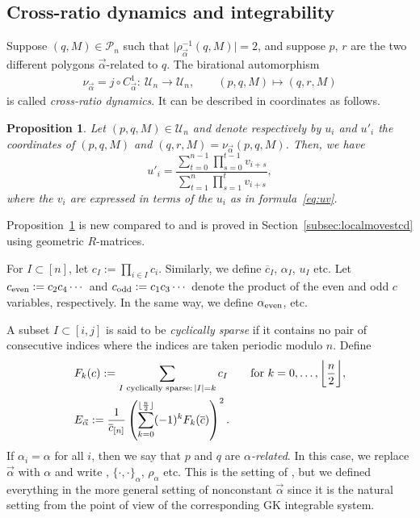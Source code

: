 \documentclass[10pt,a4paper]{amsart}
\numberwithin{equation}{section}
\newtheorem{Proposition}[Theorem]{Proposition}
 { \theoremstyle{definition}
\newtheorem{Definition}[Theorem]{Definition}
\newtheorem{Note}[Theorem]{Note}
\newtheorem{Example}[Theorem]{Example}
\newtheorem{Remark}[Theorem]{Remark} }
\DeclarePairedDelimiter\floor{\lfloor}{\rfloor}
\newcommand{\ra}{\rightarrow}
\begin{document}
	\subsection{Cross-ratio dynamics and integrability}
	
	Suppose $(q,M) \in \mathcal P_n$ such that $\bigl|\rho_{\vec \alpha}^{-1}(q,M)\bigr|=2$, and suppose $p$, $r$ are the two different polygons $\vec \alpha$-related to $q$. The birational automorphism
	\begin{align*}
		\nu_{\vec \alpha}=j\circ C^1_{\vec \alpha}\colon \ \mathcal U_n \ra \mathcal U_n,\qquad
		(p,q,M) \mapsto (q,r,M)
	\end{align*}
	is called \emph{cross-ratio dynamics}. It can be described in coordinates as follows.
	
	\begin{Proposition}
		\label{prop:uevolution}
		Let $(p,q,M)\in \mathcal U_n$ and denote respectively by $u_i$ and $u'_i$ the coordinates of $(p,q,M)$ and $(q,r,M)=\nu_{\vec \alpha}(p,q,M)$. Then, we have
		\begin{equation}
			\label{eq:ILP}
			u'_i=\frac{\sum\limits_{t=0}^{n-1}\prod\limits_{s=0}^{t-1}v_{i+s}}{\sum\limits_{t=1}^{n}\prod\limits_{s=1}^{t}v_{i+s}},
		\end{equation}
		where the $v_i$ are expressed in terms of the $u_i$ as in formula~\eqref{eq:uv}.
	\end{Proposition}
	
	Proposition~\ref{prop:uevolution} is new compared to \cite{AFIT} and is proved in Section~\ref{subsec:localmovestcd} using geometric $R$-matrices.
	
	For $I \subset [n]$, let $c_I:=\prod_{i \in I} {c_i}$. Similarly, we define $\overline{c}_I$, $\alpha_I$, $u_I$ etc. Let $c_{{\rm even}}:=c_2 c_4 \cdots $
and $c_{{\rm odd}}:=c_1 c_3 \cdots $ denote the product of the even and odd $c$ variables, respectively. In the same way, we define $\alpha_{{\rm even}}$, etc.
	
	A subset $I \subset [i,j]$ is said to be \emph{cyclically sparse} if it contains no pair of consecutive indices where the indices are taken periodic modulo $n$. Define
	\begin{align*}
		&F_k(c):= \sum_{I \text{ cyclically sparse}: \, |I|=k} c_I \qquad\text{for $k=0,\dots, \biggl\lfloor{\frac n 2}\biggr\rfloor$},\\
		&E_{\vec \alpha}:= \frac{1}{\overline c_{[n]}} \left( \sum_{k=0}^{\floor{\frac n 2}} (-1)^k F_k (\overline{c}
		) \right)^2.
	\end{align*}
If $\alpha_i = \alpha$ for all $i$, then we say that $p$ and $q$ are \emph{$\alpha$-related}. In this case, we replace $\vec{\alpha}$ with $\alpha$ and write , $\{\cdot,\cdot\}_\alpha$, $\rho_\alpha$ etc. This is the setting of \cite{AFIT}, but we defined everything in the more general setting of nonconstant $\vec \alpha$ since it is the natural setting from the point of view of the corresponding GK integrable system.
	
\end{document}
